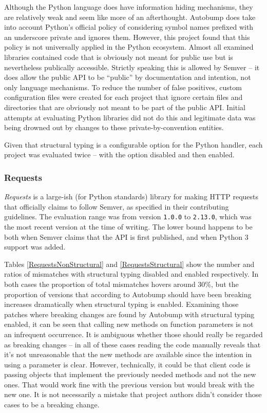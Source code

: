\documentclass{l4proj}
\newcommand\genericstyle{\lstset{basicstyle=\ttm}}
\newcommand\codeinline[1]{{\genericstyle\lstinline!#1!}}
\begin{document}
Although the Python language does have information hiding mechanisms,
they are relatively weak and seem like more of an afterthought.
Autobump does take into account Python's official policy of
considering symbol names prefixed with an underscore private and
ignores them. However, this project found that this policy is not
universally applied in the Python ecosystem. Almost all examined
libraries contained code that is obviously not meant for public use
but is nevertheless publically accessible. Strictly speaking this is
allowed by Semver -- it does allow the public API to be ``public'' by
documentation and intention, not only language mechanisms. To reduce
the number of false positives, custom configuration files were created
for each project that ignore certain files and directories that are
obviously not meant to be part of the public API. Initial attempts at
evaluating Python libraries did not do this and legitimate data was
being drowned out by changes to these private-by-convention entities.

Given that structural typing is a configurable option for the Python
handler, each project was evaluated twice -- with the option disabled
and then enabled.

\subsubsection{Requests}

\textit{Requests} is a large-ish (for Python standards) library for
making HTTP requests that officially claims to follow Semver, as
specified in their contributing guidelines. The evaluation range was
from version \codeinline{1.0.0} to \codeinline{2.13.0}, which was the
most recent version at the time of writing. The lower bound happens to
be both when Semver claims that the API is first published, and when
Python 3 support was added.

Tables \ref{RequestsNonStructural} and \ref{RequestsStructural} show
the number and ratios of mismatches with structural typing disabled
and enabled respectively. In both cases the proportion of total
mismatches hovers around 30\%, but the proportion of versions that
according to Autobump should have been breaking increases dramatically
when structural typing is enabled. Examining those patches where
breaking changes are found by Autobump with structural typing enabled,
it can be seen that calling new methods on function parameters is not
an infrequent occurrence. It is ambiguous whether those should really
be regarded as breaking changes -- in all of these cases reading the
code manually reveals that it's not unreasonable that the new methods
are available since the intention in using a parameter is clear.
However, technically, it could be that client code is passing objects
that implement the previously needed methods and not the new ones.
That would work fine with the previous version but would break with
the new one. It is not necessarily a mistake that project authors
didn't consider those cases to be a breaking change.
\end{document}
